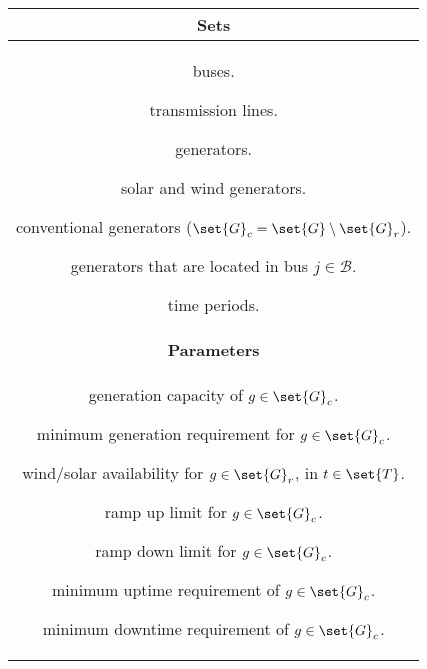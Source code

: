 
\usepackage{multicol}



\newcommand{\usedgen}{G^+}
\newcommand{\overgen}{G^-}

\setlength{\columnsep}{1.5cm}
\setlength{\columnseprule}{0.2pt}
\begin{table} [h]
\centering
\footnotesize
\begin{tabular}{c}
\toprule
\textbf{Sets} \\ 
\midrule
\begin{minipage}{0.95\textwidth}
\begin{multicols}{3}
\begin{description}[labelwidth=\widthof{$\mathcal{W}$:}]
\item[$\set{B}$:] buses.
\item[$\set{L}$:] transmission lines.
\item[$\mathcal{G}$:] generators.
\item[$\mathcal{G}_r$:] solar and wind generators.
\item[$\mathcal{G}_c$:] conventional generators ($\set{G}_c = \set{G} \setminus \set{G}_r$).
\item[$\mathcal{G}_j$:] generators that are located in bus $j \in \mathcal{B}$.
\item[$\mathcal{T}$:] time periods.
\end{description}
\end{multicols}
\end{minipage} \smallskip \\ 
\midrule
\textbf{Parameters} \\ 
\midrule
\begin{minipage}{0.95\textwidth}
\begin{multicols}{2} 
\begin{description}[labelwidth=\widthof{[$G^{\text{avail}}_{gt}$:]}]
\item[$G^{\max}_g$:] generation capacity of $g \in \set{G}_c$.
\item[$G^{\min}_g$:] minimum generation requirement for $g \in \set{G}_c$.
\item[$G^{\text{avail}}_{gt}$:] wind/solar availability for $g \in \set{G}_r$, in $t \in \set{T}$.
\item[$\Delta G^{\max}_g$:] ramp up limit for $g \in \set{G}_c$.
\item[$\Delta G^{\min}_g$:] ramp down limit for $g \in \set{G}_c$.
\item[$UT_g$:] minimum uptime requirement of $g \in \set{G}_c$.
\item[$DT_g$:] minimum downtime requirement of $g \in \set{G}_c$.

\end{description}
\end{multicols}
\end{minipage}
\end{tabular}
\end{table}

